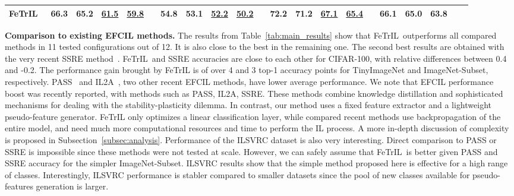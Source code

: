 \documentclass[10pt,twocolumn,letterpaper]{article}
\makeatletter
\newcommand{\ourmodel}{FeTrIL\@\xspace}
\newcommand{\ourmodelone}{FeTrIL~}
\makeatother
\begin{document}
\begin{table*}[t]
\begin{center}
{\begin{tabular}{@{\kern0.5em}llccccccccccccccccccc@{\kern0.5em}}
\ourmodelone  & \textbf{66.3} & \textbf{65.2} & \underline{61.5} & \underline{59.8} && \textbf{54.8} & \textbf{53.1} & \underline{52.2} & \underline{50.2} && \textbf{72.2} & \textbf{71.2} & \underline{67.1} & \underline{65.4} && \textbf{66.1} & \textbf{65.0} & \textbf{63.8} \\     
\hline
\end{tabular}
}
\end{center}
\vspace{-2mm}
	\caption{Average top-1 incremental accuracy in EFCIL with different numbers of incremental steps.
	\ourmodelone results are reported with pseudo-features translated from the most similar new class.
	"-" cells indicate that results were not available (see supp. material for details). "x" cells indicate that the configuration is impossible for that method. 
	\textbf{Best results - in bold}, \underline{second best - underlined}.\vspace{-4.3mm}}
\label{tab:main_results}
\end{table*}


\textbf{Comparison to existing EFCIL methods.} The results from Table~\ref{tab:main_results} show that \ourmodelone outperforms all compared methods in 11 tested configurations out of 12. 
It is also close to the best in the remaining one.
The second best results are obtained with the very recent SSRE method~\cite{zhu2022self}.
\ourmodelone and SSRE accuracies are close to each other for CIFAR-100, with relative differences between 0.4 and -0.2.
The performance gain brought by \ourmodel is of over 4 and 3 top-1 accuracy points for TinyImageNet and ImageNet-Subset, respectively. 
PASS~\cite{zhu2021pass} and IL2A~\cite{zhu2021class}, two other recent EFCIL methods, have lower average performance.
We note that EFCIL performance boost was recently reported, with methods such as PASS, IL2A, SSRE.
These methods combine knowledge distillation and sophisticated mechanisms for dealing with the stability-plasticity dilemma.
In contrast, our method uses a fixed feature extractor and a lightweight pseudo-feature generator. 
\ourmodel only optimizes a linear classification layer, while compared recent methods use backpropagation of the entire model, and need much more computational resources and time to perform the IL process.
A more in-depth discussion of complexity is proposed in Subsection~\ref{subsec:analysis}.
Performance of the ILSVRC dataset is also very interesting. 
Direct comparison to PASS or SSRE is impossible since these methods were not tested at scale.
However, we can safely assume that \ourmodelone is better given PASS and SSRE accuracy for the simpler ImageNet-Subset. 
ILSVRC results show that the simple method proposed here is effective for a high range of classes. 
Interestingly, ILSVRC performance is stabler compared to smaller datasets since the pool of new classes available for pseudo-features generation is larger.
\end{document}
